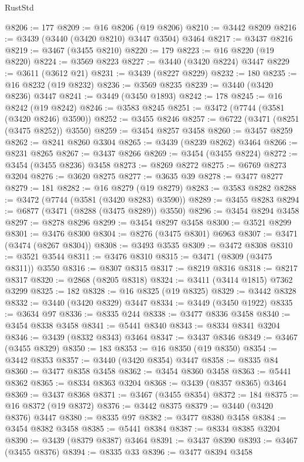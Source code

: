\begin{lexlean}{RustStd}
\begin{coremodule}
{{{{{{{{{{{{{{{{{{{@8206 := 177
@8209 := @16 @8206 (@19 @8206)
@8210 := @3442 @8209
@8216 := @3439 (@3440 (@3420 @8210) @3447 @3504) @3464
@8217 := @3437 @8216
@8219 := @3467 (@3455 @8210)
@8220 := 179
@8223 := @16 @8220 (@19 @8220)
@8224 := @3569 @8223
@8227 := @3440 (@3420 @8224) @3447
@8229 := @3611 (@3612 @21)
@8231 := @3439 (@8227 @8229)
@8232 := 180
@8235 := @16 @8232 (@19 @8232)
@8236 := @3569 @8235
@8239 := @3440 (@3420 @8236) @3447
@8241 := @3449 (@3450 @1893)
@8242 := 178
@8245 := @16 @8242 (@19 @8242)
@8246 := @3583 @8245
@8251 := @3472 (@7744 (@3581 (@3420 @8246) @3590))
@8252 := @3455 @8246
@8257 := @6722 (@3471 (@8251 (@3475 @8252)) @3550)
@8259 := @3454 @8257 @3458
@8260 := @3457 @8259
@8262 := @8241 @8260 @3304
@8265 := @3439 (@8239 @8262) @3464
@8266 := @8231 @8265
@8267 := @3437 @8266
@8269 := @3454 (@3455 @8224)
@8272 := @3454 (@3455 @8236) @3458
@8273 := @8269 @8272
@8275 := @6769 @8273 @3204
@8276 := @3620 @8275
@8277 := @3635 @39
@8278 := @3477 @8277
@8279 := 181
@8282 := @16 @8279 (@19 @8279)
@8283 := @3583 @8282
@8288 := @3472 (@7744 (@3581 (@3420 @8283) @3590))
@8289 := @3455 @8283
@8294 := @6877 (@3471 (@8288 (@3475 @8289)) @3550)
@8296 := @3454 @8294 @3458
@8297 := @8278 @8296
@8299 := @3454 @8297 @3458
@8300 := @3521 @8299
@8301 := @3476 @8300
@8304 := @8276 (@3475 @8301) @6963
@8307 := @3471 (@3474 (@8267 @8304))
@8308 := @3493 @3535
@8309 := @3472 @8308
@8310 := @3521 @3544
@8311 := @3476 @8310
@8315 := @3471 (@8309 (@3475 @8311)) @3550
@8316 := @8307 @8315
@8317 := @8219 @8316
@8318 := @8217 @8317
@8320 := @2868 (@8205 @8318)
@8324 := @3411 (@3414 @1815) @7362 @3299
@8325 := 182
@8328 := @16 @8325 (@19 @8325)
@8329 := @3442 @8328
@8332 := @3440 (@3420 @8329) @3447
@8334 := @3449 (@3450 @1922)
@8335 := @3634 @97
@8336 := @8335 @244
@8338 := @3477 @8336 @3458
@8340 := @3454 @8338 @3458
@8341 := @5441 @8340
@8343 := @8334 @8341 @3204
@8346 := @3439 (@8332 @8343) @3464
@8347 := @3437 @8346
@8349 := @3467 (@3455 @8329)
@8350 := 183
@8353 := @16 @8350 (@19 @8350)
@8354 := @3442 @8353
@8357 := @3440 (@3420 @8354) @3447
@8358 := @8335 @84
@8360 := @3477 @8358 @3458
@8362 := @3454 @8360 @3458
@8363 := @5441 @8362
@8365 := @8334 @8363 @3204
@8368 := @3439 (@8357 @8365) @3464
@8369 := @3437 @8368
@8371 := @3467 (@3455 @8354)
@8372 := 184
@8375 := @16 @8372 (@19 @8372)
@8376 := @3442 @8375
@8379 := @3440 (@3420 @8376) @3447
@8380 := @8335 @97
@8382 := @3477 @8380 @3458
@8384 := @3454 @8382 @3458
@8385 := @5441 @8384
@8387 := @8334 @8385 @3204
@8390 := @3439 (@8379 @8387) @3464
@8391 := @3437 @8390
@8393 := @3467 (@3455 @8376)
@8394 := @8335 @33
@8396 := @3477 @8394 @3458
}}}}}}}}}}}}}}}}}}}
\end{coremodule}
\end{lexlean}
